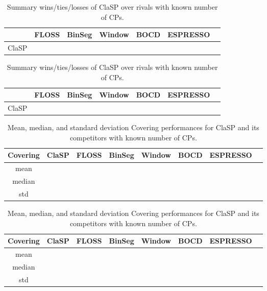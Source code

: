 \documentclass[pdflatex,sn-basic]{sn-jnl}
\begin{document}
\begin{table}[t]
	\caption{Summary wins/ties/losses of ClaSP over rivals with known number of CPs.\label{tab:semi-supervised_wtl}}	
	\begin{minipage}{12cm}
	\begin{centering}
		\begin{tabular}{c|cccccc}
			\toprule 			
			& FLOSS & BinSeg & Window & BOCD & ESPRESSO \tabularnewline
			\hline 
			ClaSP &  &  &  &  &  \tabularnewline
			\bottomrule 			
		\end{tabular}
	\par\end{centering}
	\end{minipage}
	\begin{minipage}{12cm}
	\begin{centering}
		\begin{tabular}{c|cccccc}
			\toprule 			
			& FLOSS & BinSeg & Window & BOCD & ESPRESSO \tabularnewline
			\hline 
			ClaSP &  &  &  &  &  \tabularnewline
			\bottomrule 			
		\end{tabular}
	\par\end{centering}
	\end{minipage}
\end{table}

\begin{table}[t]
	\caption{Mean, median, and standard deviation Covering performances for ClaSP and its competitors with known number of CPs. \label{tab:semi-supervised_summary}}
	\begin{minipage}{12cm}
	\begin{centering}
		\begin{tabular}{c|ccccccc}
			\toprule 			
			Covering & ClaSP & FLOSS & BinSeg & Window & BOCD & ESPRESSO\tabularnewline
			\hline 
			 mean &  &  &  &  &  &  \tabularnewline
			 median &  &  &  & &  &  \tabularnewline
			 std &  &  &  &  &  &  \tabularnewline
			\bottomrule 			
		\end{tabular}
	\par\end{centering}
	\end{minipage}
	\begin{minipage}{12cm}
	\begin{centering}
		\begin{tabular}{c|ccccccc}
			\toprule 			
			Covering & ClaSP & FLOSS & BinSeg & Window & BOCD & ESPRESSO\tabularnewline
			\hline 
			 mean &  &  &  &  &  &  \tabularnewline
			 median &  &  &  & &  &  \tabularnewline
			 std &  &  &  &  &  &  \tabularnewline
			\bottomrule 			
		\end{tabular}
	\par\end{centering}
	\end{minipage}
\end{table}
\end{document}
